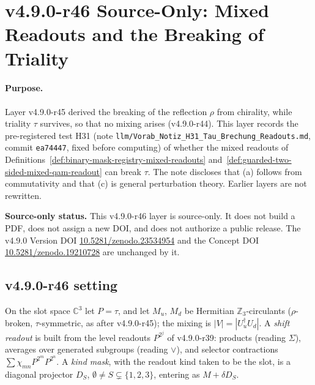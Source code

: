\clearpage
\section*{v4.9.0-r46 Source-Only: Mixed Readouts and the Breaking of Triality}
\label{sec:v490-r46-readouts-triality-breaking}

\paragraph{Purpose.}
Layer v4.9.0-r45 derived the breaking of the reflection \(\rho\) from chirality, while triality \(\tau\) survives, so that no mixing arises
(v4.9.0-r44).  This layer records the pre-registered test H31 (note \texttt{llm/Vorab\_Notiz\_H31\_Tau\_Brechung\_Readouts.md}, commit
\texttt{ea74447}, fixed before computing) of whether the mixed readouts of
Definitions~\ref{def:binary-mask-registry-mixed-readouts} and~\ref{def:guarded-two-sided-mixed-qam-readout} can break \(\tau\).  The note
discloses that (a) follows from commutativity and that (c) is general perturbation theory.  Earlier layers are not rewritten.

\noindent\textbf{Source-only status.}
This v4.9.0-r46 layer is source-only.  It does not build a PDF, does not assign a new DOI,
and does not authorize a public release.  The v4.9.0 Version DOI
\href{https://doi.org/10.5281/zenodo.23534954}{10.5281/zenodo.23534954} and the Concept DOI
\href{https://doi.org/10.5281/zenodo.19210728}{10.5281/zenodo.19210728} are unchanged by it.

\subsection*{v4.9.0-r46 setting}
\label{subsec:v490-r46-setting}

On the slot space \(\mathbb C^3\) let \(P=\tau\), and let \(M_u\), \(M_d\) be Hermitian \(\mathbb Z_3\)-circulants (\(\rho\)-broken, \(\tau\)-symmetric, as
after v4.9.0-r45); the mixing is \(|V|=|U_u^\dagger U_d|\).  A \emph{shift readout} is built from the level readouts \(P^{2^j}\) of v4.9.0-r39:
products (reading \(\Sigma\)), averages over generated subgroups (reading \(\vee\)), and selector contractions \(\sum\chi_{mn}P^{2^m}P^{2^n}\).  A
\emph{kind mask}, with the readout kind taken to be the slot, is a diagonal projector \(D_S\), \(\emptyset\neq S\subsetneq\{1,2,3\}\), entering as
\(M+\delta D_S\).

